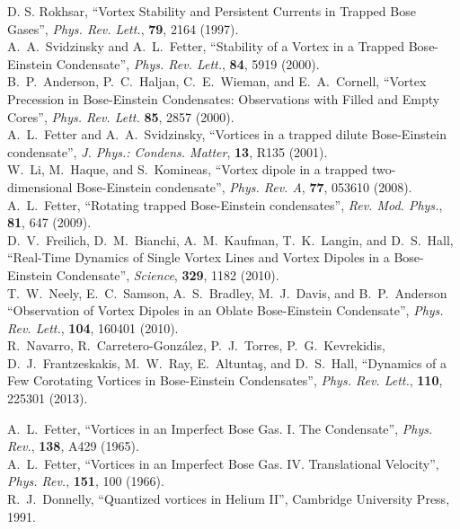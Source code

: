 \documentclass[a4paper, onecolumn]{revtex4-1}
\begin{document}
\begin{thebibliography}{1}
D. S. Rokhsar, 
``Vortex Stability and Persistent Currents in Trapped Bose Gases'', 
{\em Phys. Rev. Lett.}, {\bf 79}, 2164 (1997).
%
\\ 
%
A.~A.~Svidzinsky and A.~L.~Fetter, ``Stability of a Vortex in a Trapped Bose-Einstein Condensate'',
{\em Phys. Rev. Lett.}, {\bf 84}, 5919 (2000).
%
\\ 
%
B.~P.~Anderson, P.~C.~Haljan, C.~E.~Wieman, and E.~A.~Cornell, 
``Vortex Precession in Bose-Einstein Condensates: Observations with Filled and Empty Cores'',
{\em Phys. Rev. Lett.} {\bf 85}, 2857 (2000).
%
\\
%
A.~L.~Fetter and A.~A.~Svidzinsky, 
``Vortices in a trapped dilute Bose-Einstein condensate'', 
{\em J. Phys.: Condens. Matter}, {\bf 13}, R135 (2001).
%
\\
%
W.~Li, M.~Haque, and S.~Komineas, 
``Vortex dipole in a trapped two-dimensional Bose-Einstein condensate'', 
{\em Phys. Rev. A}, {\bf 77}, 053610 (2008).
%
\\ 
%
A.~L.~Fetter, ``Rotating trapped Bose-Einstein condensates'', {\em Rev. Mod. Phys.}, {\bf 81}, 647
(2009).
%
\\ 
%
D.~V.~Freilich, D.~M.~Bianchi, A.~M.~Kaufman, T.~K.~Langin, and D.~S.~Hall, 
``Real-Time Dynamics of Single Vortex Lines and Vortex Dipoles in a Bose-Einstein Condensate'', 
{\em Science}, {\bf 329}, 1182 (2010).
%
\\
%
T.~W.~Neely, E.~C.~Samson, A.~S.~Bradley, M.~J.~Davis, and B.~P.~Anderson
``Observation of Vortex Dipoles in an Oblate Bose-Einstein Condensate'', 
{\em Phys. Rev. Lett.}, {\bf 104}, 160401 (2010).
%
\\
%
R.~Navarro, R.~Carretero-Gonz\'alez, P.~J.~Torres, P.~G.~Kevrekidis, D.~J.~Frantzeskakis, M.~W.~Ray,
E.~Altunta\c{s}, and D.~S.~Hall, 
``Dynamics of a Few Corotating Vortices in Bose-Einstein Condensates'', 
{\em Phys. Rev. Lett.}, {\bf 110}, 225301 (2013).


%
A.~L.~Fetter, 
``Vortices in an Imperfect Bose Gas. I. The Condensate'', 
{\em Phys. Rev.}, {\bf 138}, A429 (1965).
%
\\ 
%
A.~L.~Fetter, 
``Vortices in an Imperfect Bose Gas. IV. Translational Velocity'', 
{\em Phys. Rev.}, {\bf 151}, 100 (1966). 
%
\\
%
R.~J.~Donnelly, ``Quantized vortices in Helium II'', Cambridge University Press, 1991.

 


\end{thebibliography}
\end{document}
